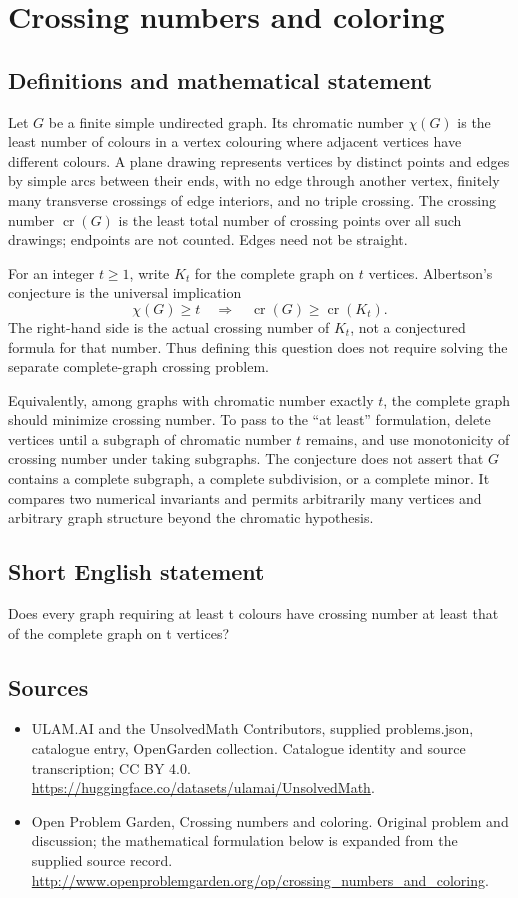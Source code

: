 \documentclass[11pt,a4paper]{article}
\begin{document}
\section*{Crossing numbers and coloring}\label{statement}

\subsection{Definitions and mathematical statement}
Let $G$ be a finite simple undirected graph. Its chromatic number
$\chi(G)$ is the least number of colours in a vertex colouring
where adjacent vertices have different colours. A plane drawing
represents vertices by distinct points and edges by simple arcs
between their ends, with no edge through another vertex, finitely
many transverse crossings of edge interiors, and no triple crossing.
The crossing number $\operatorname{cr}(G)$ is the least total number
of crossing points over all such drawings; endpoints are not counted.
Edges need not be straight.

For an integer $t\ge1$, write $K_t$ for the complete graph on $t$
vertices. Albertson's conjecture is the universal implication
\[
                          \chi(G)\ge t
                 \quad\Longrightarrow\quad
                          \operatorname{cr}(G)\ge\operatorname{cr}(K_t).
\]
The right-hand side is the actual crossing number of $K_t$, not a
conjectured formula for that number. Thus defining this question
does not require solving the separate complete-graph crossing problem.

Equivalently, among graphs with chromatic number exactly $t$, the
complete graph should minimize crossing number. To pass to the
``at least'' formulation, delete vertices until a subgraph of
chromatic number $t$ remains, and use monotonicity of crossing number
under taking subgraphs. The conjecture does not assert that $G$
contains a complete subgraph, a complete subdivision, or a complete
minor. It compares two numerical invariants and permits arbitrarily
many vertices and arbitrary graph structure beyond the chromatic
hypothesis.
\subsection{Short English statement}
Does every graph requiring at least t colours have crossing number at least that of the complete graph on t vertices?
\subsection{Sources}
\begin{itemize}
\item[S1] ULAM.AI and the UnsolvedMath Contributors, supplied problems.json, catalogue entry, OpenGarden collection. Catalogue identity and source transcription; CC BY 4.0.
\url{https://huggingface.co/datasets/ulamai/UnsolvedMath}.
\item[S2] Open Problem Garden, Crossing numbers and coloring. Original problem and discussion; the mathematical formulation below is expanded from the supplied source record.
\url{http://www.openproblemgarden.org/op/crossing_numbers_and_coloring}.
\end{itemize}
\end{document}
